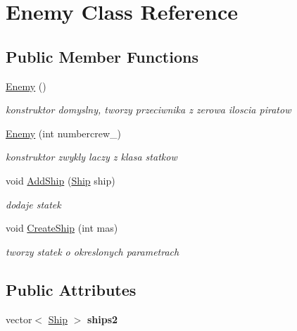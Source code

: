 \hypertarget{class_enemy}{}\section{Enemy Class Reference}
\label{class_enemy}
\subsection*{Public Member Functions}
\begin{DoxyCompactItemize}
\item 
\mbox{\label{class_enemy_a94f30d348b6d2840fd71675472ba38dd}} 
\hyperlink{class_enemy_a94f30d348b6d2840fd71675472ba38dd}{Enemy} ()
\begin{DoxyCompactList}\small\item\em konstruktor domyslny, tworzy przeciwnika z zerowa iloscia piratow \end{DoxyCompactList}\item 
\mbox{\label{class_enemy_abaf7fffe0200056c76228d6e27904e40}} 
\hyperlink{class_enemy_abaf7fffe0200056c76228d6e27904e40}{Enemy} (int numbercrew\+\_\+)
\begin{DoxyCompactList}\small\item\em konstruktor zwykly laczy z klasa statkow \end{DoxyCompactList}\item 
\mbox{\label{class_enemy_ad876e376e71d068698bcc7656b68f753}} 
void \hyperlink{class_enemy_ad876e376e71d068698bcc7656b68f753}{Add\+Ship} (\hyperlink{class_ship}{Ship} ship)
\begin{DoxyCompactList}\small\item\em dodaje statek \end{DoxyCompactList}\item 
\mbox{\label{class_enemy_aaadffa4aee876d722b821fe2588ed0ae}} 
void \hyperlink{class_enemy_aaadffa4aee876d722b821fe2588ed0ae}{Create\+Ship} (int mas)
\begin{DoxyCompactList}\small\item\em tworzy statek o okreslonych parametrach \end{DoxyCompactList}\end{DoxyCompactItemize}
\subsection*{Public Attributes}
\begin{DoxyCompactItemize}
\item 
\mbox{\label{class_enemy_a8d89e5413c698cba1b9164eddf1bdb87}} 
vector$<$ \hyperlink{class_ship}{Ship} $>$ {\bfseries ships2}
\end{DoxyCompactItemize}
